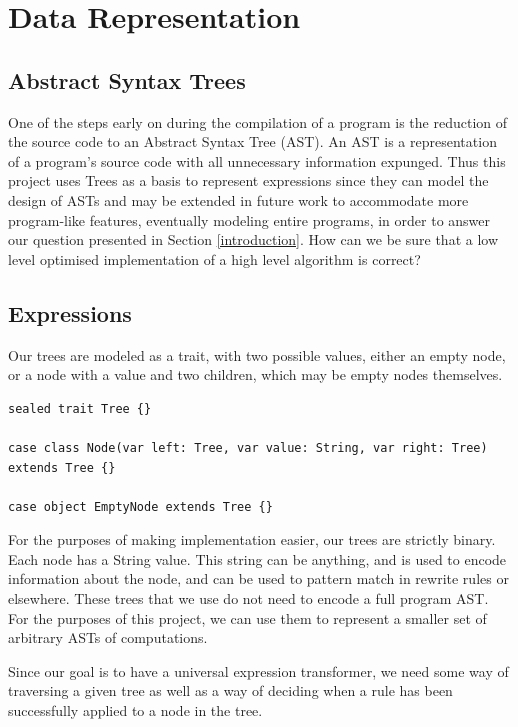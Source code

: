 \documentclass{l4proj}
\begin{document}
\section{Data Representation}

\subsection{Abstract Syntax Trees}

One of the steps early on during the compilation of a program is the reduction of the source code to an Abstract Syntax Tree (AST). An AST is a representation of a program's source code with all unnecessary information expunged. Thus this project uses Trees as a basis to represent expressions since they can model the design of ASTs and may be extended in future work to accommodate more program-like features, eventually modeling entire programs, in order to answer our question presented in Section \ref{introduction}. How can we be sure that a low level optimised implementation of a high level algorithm is correct?


\subsection{Expressions}

Our trees are modeled as a trait, with two possible values, either an empty node, or a node with a value and two children, which may be empty nodes themselves.

\begin{minipage}{\linewidth}
\begin{lstlisting}[caption={Definition of a Tree}]
sealed trait Tree {}

case class Node(var left: Tree, var value: String, var right: Tree) extends Tree {}

case object EmptyNode extends Tree {}
\end{lstlisting}
\end{minipage}

For the purposes of making implementation easier, our trees are strictly binary. Each node has a String value. This string can be anything, and is used to encode information about the node, and can be used to pattern match in rewrite rules or elsewhere.
These trees that we use do not need to encode a full program AST. For the purposes of this project, we can use them to represent a smaller set of arbitrary ASTs of computations.


Since our goal is to have a universal expression transformer, we need some way of traversing a given tree as well as a way of deciding when a rule has been successfully applied to a node in the tree.
\end{document}
